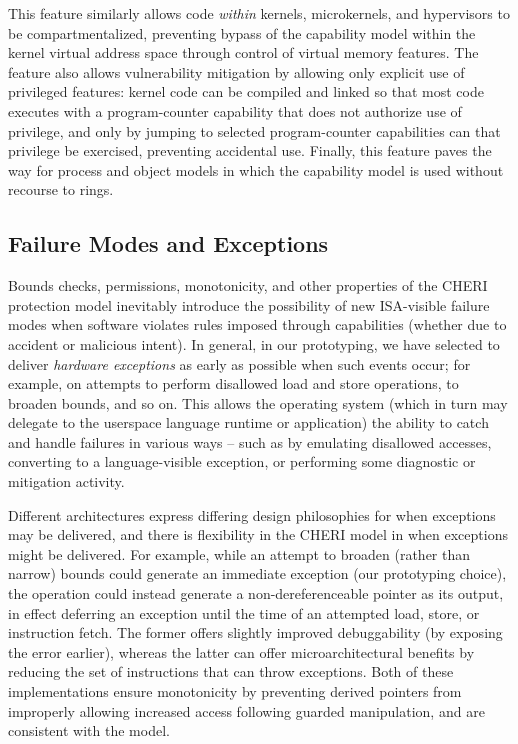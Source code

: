 This feature similarly allows code \emph{within} kernels, microkernels, and
hypervisors to be compartmentalized, preventing bypass of the capability model
within the kernel virtual address space through control of virtual memory
features.
The feature also allows vulnerability mitigation by allowing only explicit
use of privileged features: kernel code can be compiled and linked so that
most code executes with a program-counter capability that does not authorize
use of privilege, and only by jumping to selected program-counter capabilities
can that privilege be exercised, preventing accidental use.
Finally, this feature paves the way for process and object models in which the
capability model is used without recourse to rings.

\subsection{Failure Modes and Exceptions}
\label{sec:failuremodesandexceptions}

Bounds checks, permissions, monotonicity, and other properties of the CHERI
protection model inevitably introduce the possibility of new ISA-visible
failure modes when software violates rules imposed through capabilities
(whether due to accident or malicious intent).
In general, in our prototyping, we have selected to deliver \textit{hardware
exceptions} as early as possible when such events occur; for example, on
attempts to perform disallowed load and store operations, to broaden bounds,
and so on.
This allows the operating system (which in turn may delegate to the userspace
language runtime or application) the ability to catch and handle failures in
various ways -- such as by emulating disallowed accesses, converting to a
language-visible exception, or performing some diagnostic or mitigation
activity.

Different architectures express differing design philosophies for when
exceptions may be delivered, and there is flexibility in the CHERI model in
when exceptions might be delivered.
For example, while an attempt to broaden (rather than narrow) bounds could
generate an immediate exception (our prototyping choice), the operation could
instead generate a non-dereferenceable pointer as its output, in effect
deferring an exception until the time of an attempted load, store, or
instruction fetch.
The former offers slightly improved debuggability (by exposing the error
earlier), whereas the latter can offer microarchitectural benefits by
reducing the set of instructions that can throw exceptions.
Both of these implementations ensure monotonicity by preventing derived
pointers from improperly allowing increased access following guarded
manipulation, and are consistent with the model.

